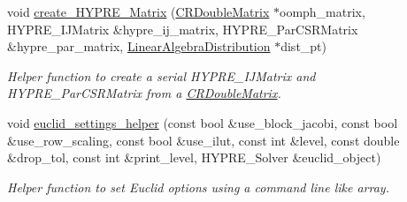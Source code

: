 \begin{DoxyCompactItemize}
void \hyperlink{namespaceoomph_1_1HypreHelpers_a3c7d0df9c9c2ce939e071a16716d7734}{create\+\_\+\+H\+Y\+P\+R\+E\+\_\+\+Matrix} (\hyperlink{classoomph_1_1CRDoubleMatrix}{C\+R\+Double\+Matrix} $\ast$oomph\+\_\+matrix, H\+Y\+P\+R\+E\+\_\+\+I\+J\+Matrix \&hypre\+\_\+ij\+\_\+matrix, H\+Y\+P\+R\+E\+\_\+\+Par\+C\+S\+R\+Matrix \&hypre\+\_\+par\+\_\+matrix, \hyperlink{classoomph_1_1LinearAlgebraDistribution}{Linear\+Algebra\+Distribution} $\ast$dist\+\_\+pt)
\begin{DoxyCompactList}\small\item\em Helper function to create a serial H\+Y\+P\+R\+E\+\_\+\+I\+J\+Matrix and H\+Y\+P\+R\+E\+\_\+\+Par\+C\+S\+R\+Matrix from a \hyperlink{classoomph_1_1CRDoubleMatrix}{C\+R\+Double\+Matrix}. \end{DoxyCompactList}\item 
void \hyperlink{namespaceoomph_1_1HypreHelpers_ab0a885165f387f79bc30e19810d111d7}{euclid\+\_\+settings\+\_\+helper} (const bool \&use\+\_\+block\+\_\+jacobi, const bool \&use\+\_\+row\+\_\+scaling, const bool \&use\+\_\+ilut, const int \&level, const double \&drop\+\_\+tol, const int \&print\+\_\+level, H\+Y\+P\+R\+E\+\_\+\+Solver \&euclid\+\_\+object)
\begin{DoxyCompactList}\small\item\em Helper function to set Euclid options using a command line like array. \end{DoxyCompactList}\end{DoxyCompactItemize}

